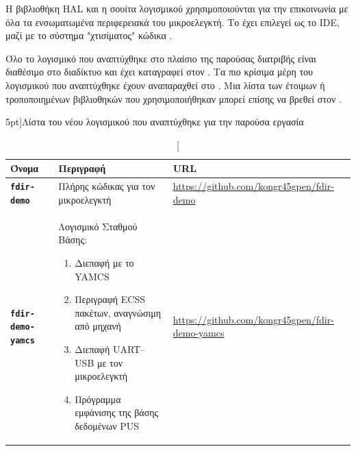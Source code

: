 \documentclass[a4paper,nobib]{tufte-book}
\begin{document}
Η βιβλιοθήκη \ac{HAL} και η σουίτα λογισμικού   χρησιμοποιούνται για την επικοινωνία με όλα τα ενσωματωμένα περιφερειακά του μικροελεγκτή. Το  έχει επιλεγεί ως το \acs{IDE}, μαζί με το σύστημα "χτισίματος" κώδικα .

Όλο το λογισμικό που αναπτύχθηκε στο πλαίσιο της παρούσας διατριβής είναι διαθέσιμο στο διαδίκτυο και έχει καταγραφεί στον . Τα πιο κρίσιμα μέρη του λογισμικού που αναπτύχθηκε έχουν αναπαραχθεί στο . Μια λίστα των έτοιμων ή τροποποιημένων βιβλιοθηκών που χρησιμοποιήθηκαν μπορεί επίσης να βρεθεί στον .


\begin{table}[h]
	\centering
	\caption[][5pt]{Λίστα του νέου λογισμικού που αναπτύχθηκε για την παρούσα εργασία}
	\label{tab:new_software}
	\begin{tabularx}{\textwidth}{@{}lXp{6cm}@{}}
		\toprule
		Όνομα & Περιγραφή & URL \\ \midrule
		\textbf{\texttt{fdir-demo}} & Πλήρης κώδικας για τον μικροελεγκτή  & \small \url{https://github.com/kongr45gpen/fdir-demo} \\
		\textbf{\texttt{fdir-demo-yamcs}} & Λογισμικό Σταθμού Βάσης: \begin{enumerate}
			\item Διεπαφή με το \acs{YAMCS}
			\item Περιγραφή \acs{ECSS} πακέτων, αναγνώσιμη από μηχανή
			\item Διεπαφή \acs{UART}--\acs{USB} με τον μικροελεγκτή
			\item Πρόγραμμα εμφάνισης της βάσης δεδομένων \acs{PUS}\vspace*{-2ex}
			\end{enumerate} & \small \url{https://github.com/kongr45gpen/fdir-demo-yamcs} \\
		\bottomrule
	\end{tabularx}
\end{table}
\end{document}
